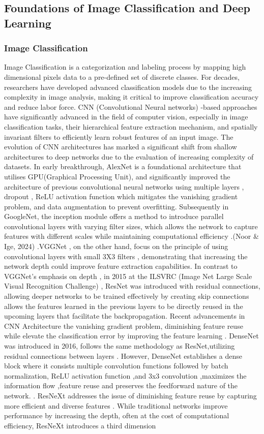 \subsection{Foundations of Image Classification and Deep Learning}
\subsubsection{Image Classification}
Image Classification is a categorization and labeling process by mapping high dimensional pixels data to a pre-defined set of discrete classes. For decades, researchers have developed advanced classification models due to the increasing complexity in image analysis, making it critical to improve classification accuracy and reduce labor force. CNN (Convolutional Neural networks) -based approaches have significantly advanced in the field of computer vision, especially in image classification tasks, their hierarchical feature extraction mechanism, and spatially invariant filters to efficiently learn robust features of an input image.  The evolution of CNN architectures has marked a significant shift from shallow architectures to deep networks due to the evaluation of increasing complexity of datasets. In early breakthrough, AlexNet is a foundational architecture that utilises GPU(Graphical Processing Unit), and significantly improved the architecture of previous convolutional neural networks using multiple layers , dropout , ReLU activation function which mitigates the vanishing gradient problem, and data augmentation to prevent overfitting. Subsequently in GoogleNet, the inception module offers a method to introduce parallel convolutional layers with varying filter sizes, which allows the network to capture features with different scales while maintaining computational efficiency .(Noor \& Ige, 2024)  .VGGNet , on the other hand, focus on the principle of using  convolutional layers with small 3X3 filters , demonstrating that increasing the network depth could improve feature extraction capabilities. In contrast to VGGNet’s emphasis on depth , in 2015 at the ILSVRC (Image Net Large Scale Visual Recognition Challenge) , ResNet was introduced with residual connections, allowing deeper networks to be trained effectively by creating skip connections allows the features learned in the previous layers to be directly reused in the upcoming layers that facilitate the backpropagation. Recent advancements in CNN Architecture the vanishing gradient problem, diminishing feature reuse while elevate the classification error by improving the feature learning . DenseNet was introduced in 2016, follows the same methodology as ResNet,utilizing residual connections between layers . However, DenseNet establishes a dense block where it consists multiple convolution functions followed by batch normalization, ReLU activation function ,and 3x3 convolution  ,maximizes the information flow ,feature reuse and preserves the feedforward nature of the network. \cite{mohdnoor2025survey}. ResNeXt addresses the issue of diminishing feature reuse by capturing more efficient and diverse features . While traditional networks improve performance by increasing the depth, often at the cost of computational efficiency, ResNeXt introduces a third dimension 